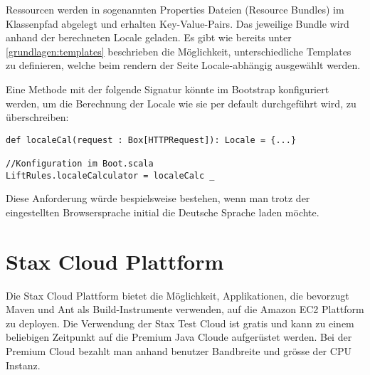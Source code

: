 Ressourcen werden in sogenannten Properties Dateien (Resource Bundles) im Klassenpfad abgelegt und erhalten Key-Value-Pairs. Das jeweilige Bundle wird anhand der berechneten Locale geladen. 
Es gibt wie bereits unter \ref{grundlagen:templates}  beschrieben die M\"oglichkeit, unterschiedliche Templates zu definieren, welche beim rendern der Seite Locale-abh\"angig ausgew\"ahlt werden.

Eine Methode mit der folgende Signatur k\"onnte im Bootstrap konfiguriert werden, um die Berechnung der Locale wie sie per default durchgef\"uhrt wird, zu \"uberschreiben:

\begin{lstlisting}[caption=\"Uberschreibung der Locale-Berechnung]
def localeCal(request : Box[HTTPRequest]): Locale = {...}

//Konfiguration im Boot.scala
LiftRules.localeCalculator = localeCalc _
\end{lstlisting}


Diese Anforderung w\"urde bespielsweise bestehen, wenn man trotz der eingestellten Browsersprache initial die Deutsche Sprache laden m\"ochte.

\section{Stax Cloud Plattform}
Die Stax Cloud Plattform\cite{Stax} bietet die M\"oglichkeit, Applikationen, die bevorzugt Maven und Ant als Build-Instrumente verwenden, auf die Amazon EC2 Plattform zu deployen. Die Verwendung der Stax Test Cloud ist gratis und kann zu einem beliebigen Zeitpunkt auf die Premium Java Cloude aufger\"ustet werden. Bei der Premium Cloud bezahlt man anhand benutzer Bandbreite und gr\"osse der CPU Instanz.






